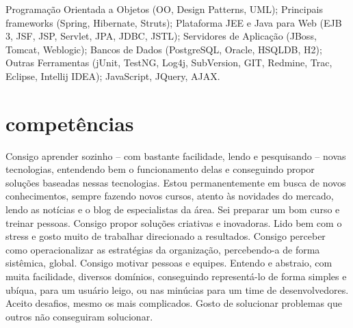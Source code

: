 Programação Orientada a Objetos (OO, Design Patterns, UML); Principais frameworks (Spring, Hibernate, Struts); Plataforma JEE e Java para Web (EJB 3, JSF, JSP, Servlet, JPA, JDBC, JSTL); Servidores de Aplicação (JBoss, Tomcat, Weblogic); Bancos de Dados (PostgreSQL, Oracle, HSQLDB, H2); Outras Ferramentas (jUnit, TestNG, Log4j, SubVersion, GIT, Redmine, Trac, Eclipse, Intellij IDEA); JavaScript, JQuery, AJAX.

\section{competências}

Consigo aprender sozinho – com bastante facilidade, lendo e pesquisando – novas tecnologias, entendendo bem o funcionamento delas e conseguindo propor soluções baseadas nessas tecnologias. Estou permanentemente em busca de novos conhecimentos, sempre fazendo novos cursos, atento às novidades do mercado, lendo as notícias e o blog de especialistas da área.
Sei preparar um bom curso e treinar pessoas.
Consigo propor soluções criativas e inovadoras.
Lido bem com o stress e gosto muito de trabalhar direcionado a resultados.
Consigo perceber como operacionalizar as estratégias da organização, percebendo-a de forma sistêmica, global.
Consigo motivar pessoas e equipes.
Entendo e abstraio, com muita facilidade, diversos domínios, conseguindo representá-lo de forma simples e ubíqua, para um usuário leigo, ou nas minúcias para um time de desenvolvedores.
Aceito desafios, mesmo os mais complicados.
Gosto de solucionar problemas que outros não conseguiram solucionar.




